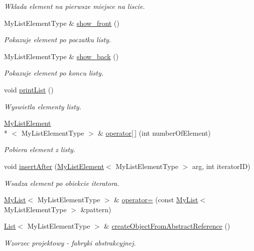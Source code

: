 \begin{DoxyCompactItemize}
\begin{DoxyCompactList}\small\item\em Wklada element na pierwsze miejsce na liscie. \end{DoxyCompactList}\item 
My\-List\-Element\-Type \& \hyperlink{class_my_list_a2fe6cb1e5caf9f1d7d9df4b44faf8506}{show\-\_\-front} ()
\begin{DoxyCompactList}\small\item\em Pokazuje element po poczatku listy. \end{DoxyCompactList}\item 
My\-List\-Element\-Type \& \hyperlink{class_my_list_a0ea03d38dcf8c5cdf1ff27ea56fe490b}{show\-\_\-back} ()
\begin{DoxyCompactList}\small\item\em Pokazuje element po koncu listy. \end{DoxyCompactList}\item 
void \hyperlink{class_my_list_adc482b791b4ba4ce44a4561c2739a334}{print\-List} ()
\begin{DoxyCompactList}\small\item\em Wyswietla elementy listy. \end{DoxyCompactList}\item 
\hyperlink{class_my_list_element}{My\-List\-Element}\\*
$<$ My\-List\-Element\-Type $>$ \& \hyperlink{class_my_list_a21f48f2665a0c7e6916e40be613b16aa}{operator\mbox{[}$\,$\mbox{]}} (int number\-Of\-Element)
\begin{DoxyCompactList}\small\item\em Pobiera element z listy. \end{DoxyCompactList}\item 
void \hyperlink{class_my_list_a4a37731b07380f33203de13f926f1ebf}{insert\-After} (\hyperlink{class_my_list_element}{My\-List\-Element}$<$ My\-List\-Element\-Type $>$ arg, int iterator\-I\-D)
\begin{DoxyCompactList}\small\item\em Wsadza element po obiekcie iteratora. \end{DoxyCompactList}\item 
\hyperlink{class_my_list}{My\-List}$<$ My\-List\-Element\-Type $>$ \& \hyperlink{class_my_list_abe6b0de77f1f5918ea26035060efff85}{operator=} (const \hyperlink{class_my_list}{My\-List}$<$ My\-List\-Element\-Type $>$ \&pattern)
\item 
\hyperlink{class_list}{List}$<$ My\-List\-Element\-Type $>$ \& \hyperlink{class_my_list_a819195298125d5b7ee02f18bd4d1152a}{create\-Object\-From\-Abstract\-Reference} ()
\begin{DoxyCompactList}\small\item\em Wzorzec projektowy -\/ fabryki abstrakcyjnej. \end{DoxyCompactList}\end{DoxyCompactItemize}
